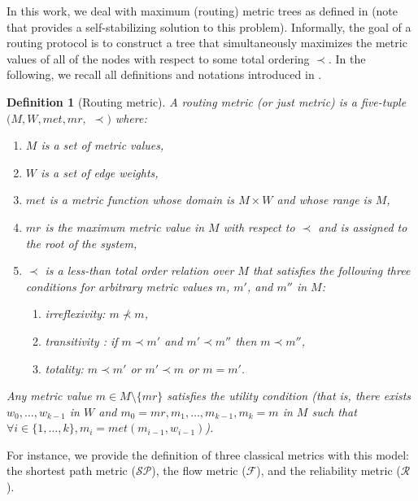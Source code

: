 \documentclass[11pt]{article}
\newtheorem{defi}{Definition}
\newenvironment{definition}[1]{\vspace{-0.25cm}\begin{defi}#1}{\end{defi}\vspace{-0.3cm}}
\begin{document}
In this work, we deal with maximum (routing) metric trees as defined in \cite{GS03j} (note that \cite{GS99c} provides a self-stabilizing solution to this problem). Informally, the goal of a routing protocol is to construct a tree that simultaneously maximizes the metric values of all of the nodes with respect to some total ordering $\prec$. In the following, we recall all definitions and notations introduced in \cite{GS03j}. 

\begin{definition}[Routing metric]
A \emph{routing metric} (or just \emph{metric}) is a five-tuple $(M,W,met,mr,$ $\prec)$ where:
\begin{enumerate}
\item $M$ is a set of metric values,
\item $W$ is a set of edge weights,
\item $met$ is a metric function whose domain is $M\times W$ and whose range is $M$,
\item $mr$ is the maximum metric value in $M$ with respect to $\prec$ and is assigned to the root of the system,
\item $\prec$ is a less-than total order relation over $M$ that satisfies the following three conditions for arbitrary metric values $m$, $m'$, and $m''$ in $M$:
\begin{enumerate}
\item irreflexivity: $m\not\prec m$,
\item transitivity : if $m\prec m'$ and $m'\prec m''$ then $m\prec m''$,
\item totality: $m\prec m'$ or $m'\prec m$ or $m=m'$.
\end{enumerate}
\end{enumerate}
Any metric value $m\in M\setminus\{mr\}$ satisfies the \emph{utility condition} (that is, there exists $w_0,\ldots,w_{k-1}$ in $W$ and $m_0=mr,m_1,\ldots,m_{k-1},m_{k}=m$ in $M$ such that $\forall i\in\{1,\ldots,k\},m_i=met(m_{i-1},w_{i-1})$).
\end{definition}

For instance, we provide the definition of three classical metrics with this model: the shortest path metric ($\mathcal{SP}$), the flow metric ($\mathcal{F}$), and the reliability metric ($\mathcal{R}$).
\end{document}
